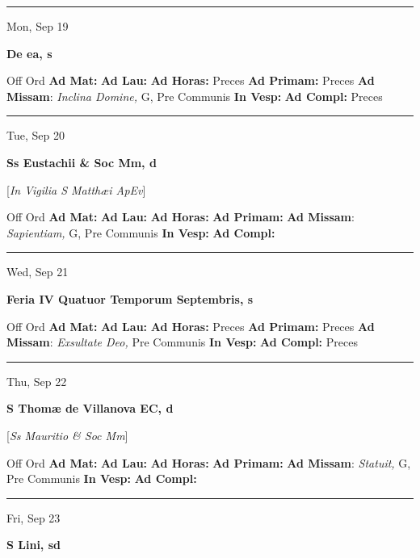 \documentclass[letterpaper, 10pt]{article}
\begin{document}
\hrule
\begin{center}
Mon, Sep 19
\end{center}\textbf{ \large De ea, \textnormal{\normalsize s}}
\begin{justify}
Off Ord
\textbf{Ad Mat: }
\textbf{Ad Lau: }
\textbf{Ad Horas: }Preces
\textbf{Ad Primam: }Preces
\textbf{Ad Missam}: \textit{Inclina Domine,} G, Pre Communis
\textbf{In Vesp: }
\textbf{Ad Compl: }Preces\end{justify}



\hrule
\begin{center}
Tue, Sep 20
\end{center}\textbf{ \large Ss Eustachii \& Soc Mm, \textnormal{\normalsize d}}

[\textit{In Vigilia S Matthæi ApEv}]
\begin{justify}
Off Ord
\textbf{Ad Mat: }
\textbf{Ad Lau: }
\textbf{Ad Horas: }
\textbf{Ad Primam: }
\textbf{Ad Missam}: \textit{Sapientiam,} G, Pre Communis
\textbf{In Vesp: }
\textbf{Ad Compl: }\end{justify}



\hrule
\begin{center}
Wed, Sep 21
\end{center}\textbf{ \large Feria IV Quatuor Temporum Septembris, \textnormal{\normalsize s}}
\begin{justify}
Off Ord
\textbf{Ad Mat: }
\textbf{Ad Lau: }
\textbf{Ad Horas: }Preces
\textbf{Ad Primam: }Preces
\textbf{Ad Missam}: \textit{Exsultate Deo,} Pre Communis
\textbf{In Vesp: }
\textbf{Ad Compl: }Preces\end{justify}



\hrule
\begin{center}
Thu, Sep 22
\end{center}\textbf{ \large S Thomæ de Villanova EC, \textnormal{\normalsize d}}

[\textit{Ss Mauritio \& Soc Mm}]
\begin{justify}
Off Ord
\textbf{Ad Mat: }
\textbf{Ad Lau: }
\textbf{Ad Horas: }
\textbf{Ad Primam: }
\textbf{Ad Missam}: \textit{Statuit,} G, Pre Communis
\textbf{In Vesp: }
\textbf{Ad Compl: }\end{justify}



\hrule
\begin{center}
Fri, Sep 23
\end{center}\textbf{ \large S Lini, \textnormal{\normalsize sd}}
\end{document}
